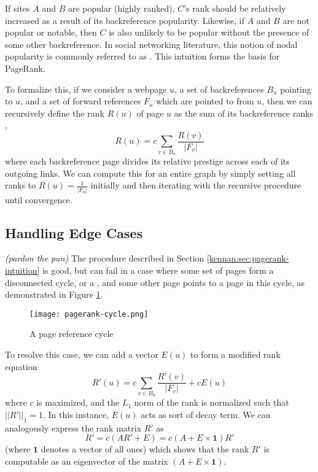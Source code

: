 \documentclass[../writeup.tex]{subfiles}
\begin{document}
If sites $A$ and $B$ are popular (highly ranked), $C$'s rank should be relatively
increased as a result of its backreference popularity. Likewise, if $A$ and $B$ are not
popular or notable, then $C$ is also unlikely to be popular without the presence of some other backreference.
In social networking literature, this notion of nodal popularity is commonly referred
to as . This intuition forms the basis for PageRank.

To formalize this, if we consider a webpage $u$, a set of backreferences $B_u$ pointing to $u$,
and a set of forward references $F_u$ which are pointed to from $u$, then we can recursively define
the rank $R(u)$ of page $u$ as the sum of its backreference ranks \autocite*[]{pagerank},
\begin{equation}\label{kennan:eq:pagerank-simplified}
    R(u) = c \sum_{v \in B_u} \frac{R(v)}{|F_v|}
\end{equation}
where each backreference page divides its relative prestige across each of its outgoing links.
We can compute this for an entire graph by simply setting all ranks to \(R(u) = \frac{1}{|F_u|}\) initially
and then iterating with the recursive procedure until convergence.

\subsection{Handling Edge Cases}\label{kennan:sec:pagerank-extension}
\textit{(pardon the pun)}
The procedure described in Section \ref{kennan:sec:pagerank-intuition} is good, but can fail in a case where some set
of pages form a disconnected cycle, or a , and some other page points
to a page in this cycle, as demonstrated in Figure \ref{kennan:fig:pagerank-cycle}.
\begin{figure}[ht]
    \centering
    \texttt{[image: pagerank-cycle.png]}
    \caption{A page reference cycle \autocite*[]{pagerank}}
    \label{kennan:fig:pagerank-cycle}
\end{figure}
To resolve this case, we can add a  vector $E(u)$ to form a
modified rank equation \autocite*[]{pagerank}
\begin{equation}\label{kennan:eq:pagerank}
    R'(u) = c \sum_{v \in B_u} \frac{R'(v)}{|F_v|} + cE(u)
\end{equation}
where $c$ is maximized, and the $L_1$ norm of the rank is normalized such that $\lvert\lvert R' \rvert\rvert_1 = 1$.
In this instance, $E(u)$ acts as sort of decay term. We can analogously express the rank matrix $R'$ as
\begin{equation}\label{kennan:eq:pagerank-matrix}
    R' = c(AR' + E) = c(A + E \times \mathbf{1})R'
\end{equation}
(where $\mathbf{1}$ denotes a vector of all ones) which shows that the rank $R'$ is computable as
an eigenvector of the matrix $(A + E \times \mathbf{1})$.
\end{document}
